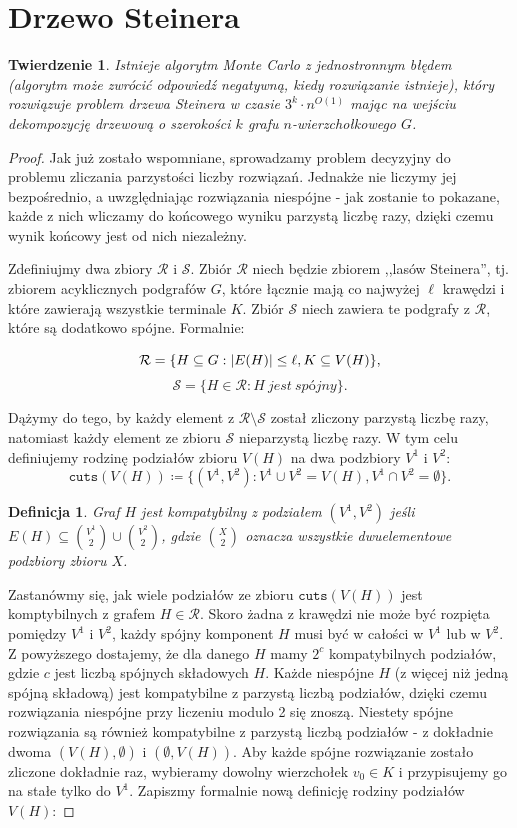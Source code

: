 \documentclass[12pt, oneside]{report}
\newtheorem{theorem}{Twierdzenie}
\newtheorem{definition}{Definicja}
\newcommand\Omicron{O}
\begin{document}
    	\section{Drzewo Steinera}


\begin{theorem}
\label{monte_carlo}
\em Istnieje algorytm Monte Carlo z jednostronnym błędem (algorytm może zwrócić odpowiedź negatywną, kiedy rozwiązanie istnieje), który rozwiązuje problem drzewa Steinera w czasie $3^k \cdot n^{\Omicron(1)}$ mając na wejściu dekompozycję drzewową o szerokości $k$ grafu $n$-wierzchołkowego $G$.
\end{theorem}

\begin{proof}
Jak już zostało wspomniane, sprowadzamy problem decyzyjny do problemu zliczania parzystości liczby rozwiązań. Jednakże nie liczymy jej bezpośrednio, a uwzględniając rozwiązania niespójne - jak zostanie to pokazane, każde z nich wliczamy do końcowego wyniku parzystą liczbę razy, dzięki czemu wynik końcowy jest od nich niezależny.

Zdefiniujmy dwa zbiory $\mathcal{R}$ i $\mathcal{S}$. Zbiór $\mathcal{R}$ niech będzie zbiorem ,,lasów Steinera'', tj. zbiorem acyklicznych podgrafów $G$, które łącznie mają co najwyżej $\ell$ krawędzi i które zawierają wszystkie terminale $K$. Zbiór $\mathcal{S}$ niech zawiera te podgrafy z $\mathcal{R}$, które są dodatkowo spójne. Formalnie:

$$\mathcal{R} = \{H \subseteq G: \abs{E(H)} \leq \ell, K \subseteq V(H)\},$$
$$\mathcal{S} = \{H \in \mathcal{R}: H\ jest\ sp\mbox{ó}jny\}.$$

Dążymy do tego, by każdy element z $\mathcal{R} \setminus \mathcal{S}$ został zliczony parzystą liczbę razy, natomiast każdy element ze zbioru $\mathcal{S}$ nieparzystą liczbę razy. W tym celu definiujemy rodzinę podziałów zbioru $V(H)$ na dwa podzbiory $V^1$ i $V^2$:
$$\texttt{cuts} (V(H)) \coloneqq \{(V^1, V^2): V^1 \cup V^2 = V(H), V^1 \cap V^2 = \emptyset\}.$$
\begin{definition}
\em \emph{Graf $H$ jest kompatybilny z podziałem $(V^1, V^2)$} jeśli $E(H) \subseteq {V^1 \choose 2} \cup {V^2 \choose 2}$, gdzie ${X \choose 2}$ oznacza wszystkie dwuelementowe podzbiory zbioru $X$.  
\end{definition}

Zastanówmy się, jak wiele podziałów ze zbioru $\texttt{cuts} (V(H))$ jest komptybilnych z grafem $H \in \mathcal{R}$. Skoro żadna z krawędzi nie może być rozpięta pomiędzy $V^1$ i $V^2$, każdy spójny komponent $H$ musi być w całości w $V^1$ lub w $V^2$. Z powyższego dostajemy, że dla danego $H$ mamy $2^c$ kompatybilnych podziałów, gdzie $c$ jest liczbą spójnych składowych $H$. Każde niespójne $H$ (z więcej niż jedną spójną składową) jest kompatybilne z parzystą liczbą podziałów, dzięki czemu rozwiązania niespójne przy liczeniu modulo 2 się znoszą. Niestety spójne rozwiązania są również kompatybilne z parzystą liczbą podziałów - z dokładnie dwoma $(V(H), \emptyset)$ i $(\emptyset, V(H))$. Aby każde spójne rozwiązanie zostało zliczone dokładnie raz, wybieramy dowolny wierzchołek $v_0 \in K$ i przypisujemy go na stałe tylko do $V^1$. Zapiszmy formalnie nową definicję rodziny podziałów $V(H)$:


\end{proof}
\end{document}
